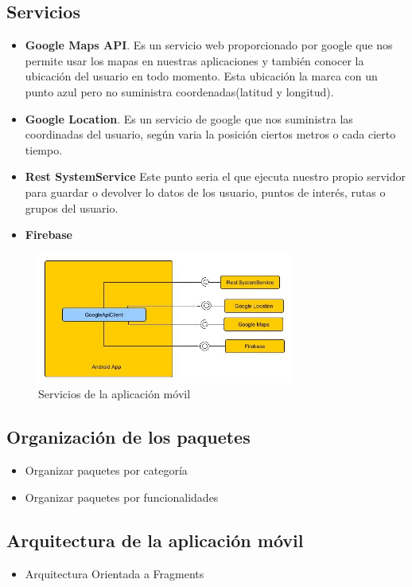 \subsection{Servicios}
\begin{itemize}
\item \textbf{Google Maps API}. Es un servicio web proporcionado por google que nos permite usar los mapas en nuestras aplicaciones y también conocer la ubicación del usuario  en todo momento. Esta ubicación la marca con un punto azul pero no suministra coordenadas(latitud y longitud).
\item \textbf{Google Location}. Es un servicio de google que nos suministra las coordinadas del usuario, según varia la posición ciertos metros o cada cierto tiempo.
\item \textbf{Rest SystemService} Este punto seria el que ejecuta nuestro propio servidor para guardar o devolver lo datos de los usuario, puntos de interés, rutas o grupos del usuario.
\item \textbf{Firebase}
\end{itemize}
\begin{figure}[H]
		\centering
		\includegraphics[width=0.75\textwidth] {arquitectura-movil.jpg}
		\caption{Servicios de la aplicación móvil }
	\end{figure}
\subsection{Organización de los paquetes}
\begin{itemize}
\item Organizar paquetes por categoría
\item Organizar paquetes por funcionalidades
\end{itemize}

\subsection{Arquitectura de la aplicación móvil}
\begin{itemize}
\item Arquitectura Orientada a Fragments
\end{itemize}
